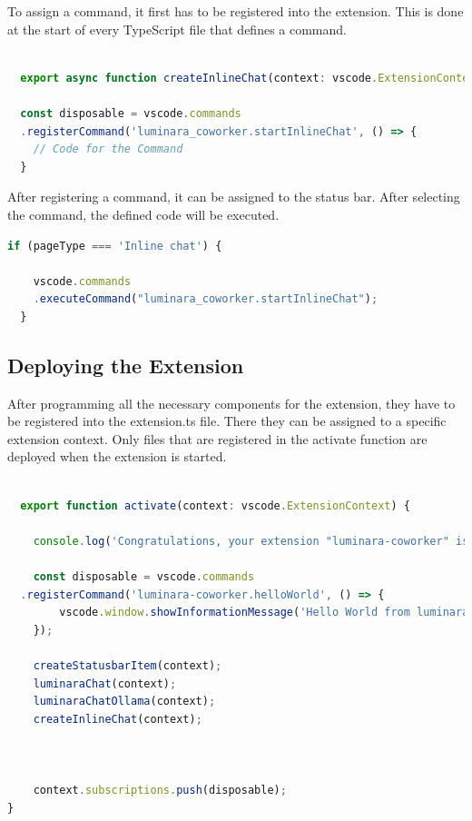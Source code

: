 To assign a command, it first has to be registered into the extension. This is done at the start of every TypeScript file that defines a command.

\begin{lstlisting}[language=TypeScript, caption={registering Command}]

  export async function createInlineChat(context: vscode.ExtensionContext ) {

  const disposable = vscode.commands
  .registerCommand('luminara_coworker.startInlineChat', () => {
    // Code for the Command
  }
\end{lstlisting}


After registering a command, it can be assigned to the status bar. After selecting the command, the defined code will be executed.

\begin{lstlisting}[language=TypeScript, caption={assigning Command}]
  if (pageType === 'Inline chat') {
        
    vscode.commands
    .executeCommand("luminara_coworker.startInlineChat");
  }
\end{lstlisting}
    

\subsection{Deploying the Extension}

After programming all the necessary components for the extension, they have to be registered into the extension.ts file.
There they can be assigned to a specific extension context. Only files that are registered in the activate function are deployed when the extension is started.

\begin{lstlisting}[language=TypeScript, caption={Deploying the Extension}]

  export function activate(context: vscode.ExtensionContext) {

	console.log('Congratulations, your extension "luminara-coworker" is now active!');
	
	const disposable = vscode.commands
  .registerCommand('luminara-coworker.helloWorld', () => {
		vscode.window.showInformationMessage('Hello World from luminara_coworker!');
	});
			
	createStatusbarItem(context);
	luminaraChat(context);
	luminaraChatOllama(context);
	createInlineChat(context);



	context.subscriptions.push(disposable);
}
\end{lstlisting}



